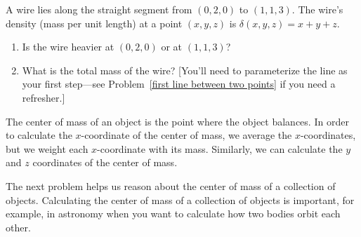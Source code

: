 \begin{problem}%
%
 A wire lies along the straight segment from $(0,2,0)$ to $(1,1,3)$.  The wire's density (mass per unit length) at a point $(x,y,z)$ is $\delta(x,y,z)=x+y+z$. 
 \begin{enumerate}
 \item Is the wire heavier at $(0,2,0)$ or at $(1,1,3)$?
 \item  What is the total mass of the wire?  [You'll need to parameterize the line as your first step---see Problem~\ref{first line between two points} if you need a refresher.]
 \end{enumerate}
\end{problem}


%
The center of mass of an object is the point where the object balances.  In order to calculate the $x$-coordinate of the center of mass, we average the $x$-coordinates, but we weight each $x$-coordinate with its mass.  Similarly, we can calculate the $y$ and $z$ coordinates of the center of mass.

The next problem helps us reason about the center of mass of a collection of objects.  Calculating the center of mass of a collection of objects is important, for example, in astronomy when you want to calculate how two bodies orbit each other.


